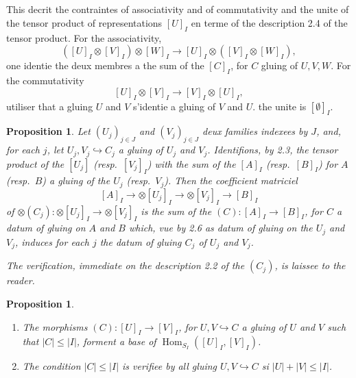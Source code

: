 \documentclass[11pt,a4paper]{article}
\theoremstyle{plain}
\newtheorem{proposition}[theorem]{Proposition}
\theoremstyle{definition}
\DeclareMathOperator{\Hom}{Hom}
\newcommand{\inj}{\hookrightarrow}
\begin{document}
\subsection{}
This decrit the contraintes of associativity and of commutativity and the unite of the tensor product of representations $[U]_I$ en terme of the description 2.4 of the tensor product. For the associativity,
\[
([U]_I \otimes [V]_I) \otimes [W]_I \to [U]_I \otimes ([V]_I \otimes [W]_I),
\]
one identie the deux membres a the sum of the $[C]_I$, for $C$ gluing of $U, V, W$. For the commutativity
\[
[U]_I \otimes [V]_I \to [V]_I \otimes [U]_I,
\]
utiliser that a gluing $U$ and $V$ s'identie a gluing of $V$ and $U$. the unite is $[\emptyset]_I$.


\begin{proposition}
Let $(U_j)_{j \in J}$ and $(V_j)_{j \in J}$ deux families indexees by $J$, and, for each $j$, let $U_j, V_j \inj C_j$ a gluing of $U_j$ and $V_j$. Identifions, by 2.3, the tensor product of the $[U_j]$ (resp.~$[V_j]_I$) with the sum of the $[A]_I$ (resp.~$[B]_I$) for $A$ (resp.~$B$) a gluing of the $U_j$ (resp.~$V_j$). Then the coefficient matriciel
\[
[A]_I \to \otimes [U_j]_I \to \otimes [V_j]_I \to [B]_I
\]
of $\otimes (C_j) : \otimes [U_j]_I \to \otimes [V_j]_I$ is the sum of the $(C) : [A]_I \to [B]_I$, for $C$ a datum of gluing on $A$ and $B$ which, vue by 2.6 as datum of gluing on the $U_j$ and $V_j$, induces for each $j$ the datum of gluing $C_j$ of $U_j$ and $V_j$.

The verification, immediate on the description 2.2 of the $(C_j)$, is laissee to the reader.
\end{proposition}

\begin{proposition}
\begin{enumerate}[label=(\roman*)]
\item The morphisms $(C) : [U]_I \to [V]_I$, for $U, V \inj C$ a gluing of $U$ and $V$ such that $|C| \leq |I|$, forment a base of $\Hom_{S_I}([U]_I, [V]_I)$.
\item The condition $|C| \leq |I|$ is verifiee by all gluing $U, V \inj C$ si $|U| + |V| \leq |I|$.
\end{enumerate}
\end{proposition}
\end{document}
